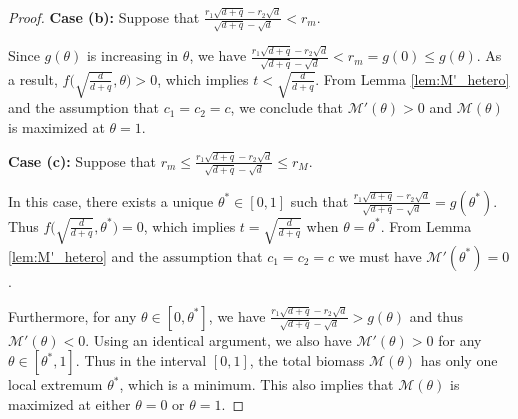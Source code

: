 \documentclass[10pt,a4paper]{amsart}
\def\MM{\mathcal{M}}
\begin{document}
\begin{proof}
\vspace{.1in}
\noindent\textbf{Case (b):} Suppose that
$\frac{r_1\sqrt{d+q}-r_2\sqrt{d}}{\sqrt{d+q}-\sqrt{d}}<r_m$.

Since $g(\theta)$ is increasing in $\theta$, we have $\frac{r_1\sqrt{d+q}-r_2\sqrt{d}}{\sqrt{d+q}-\sqrt{d}}<r_m=g(0)\leq g(\theta)$. As a result, 
$f\big(\sqrt{\frac{d}{d+q}},\theta\big) >0$, which implies $t<\sqrt{\frac{d}{d+q}}$. From Lemma \ref{lem:M'_hetero} and the assumption that $c_1=c_2=c$, we  conclude that $\MM'(\theta)>0$ and $\MM(\theta)$ is maximized at $\theta=1$.

\vspace{.1in}
\noindent\textbf{Case (c):} Suppose that $r_m\leq \frac{r_1\sqrt{d+q}-r_2\sqrt{d}}{\sqrt{d+q}-\sqrt{d}}\leq r_M$.
\vspace{.1in}

In this case, there exists a unique $\theta^*\in[0,1]$ such that $\frac{r_1\sqrt{d+q}-r_2\sqrt{d}}{\sqrt{d+q}-\sqrt{d}}=g(\theta^*)$. Thus $f\big(\sqrt{\frac{d}{d+q}},\theta^*\big) =0$, which  implies $t=\sqrt{\frac{d}{d+q}}$ when $\theta=\theta^*$. From Lemma \ref{lem:M'_hetero} and the assumption that $c_1=c_2=c$ we must have $\MM'(\theta^*)=0$. 

Furthermore, for any $\theta\in[0,\theta^*]$, we have $\frac{r_1\sqrt{d+q}-r_2\sqrt{d}}{\sqrt{d+q}-\sqrt{d}}>g(\theta)$ and thus $\MM'(\theta)<0$. Using an identical argument, we also have $\MM'(\theta)>0$ for any $\theta\in[\theta^*,1]$. Thus in the interval $[0,1]$, the total biomass $\MM(\theta)$ has only one local extremum $\theta^*$, which is a minimum. This also implies that $\MM(\theta)$ is maximized at either $\theta=0$ or $\theta=1$.
\end{proof}
\end{document}
